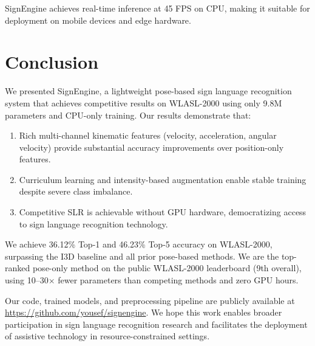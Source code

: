 \documentclass[conference]{IEEEtran}
\begin{document}
SignEngine achieves real-time inference at 45 FPS on CPU, making it suitable for deployment on mobile devices and edge hardware.

\section{Conclusion}

We presented SignEngine, a lightweight pose-based sign language recognition system that achieves competitive results on WLASL-2000 using only 9.8M parameters and CPU-only training. Our results demonstrate that:

\begin{enumerate}
    \item Rich multi-channel kinematic features (velocity, acceleration, angular velocity) provide substantial accuracy improvements over position-only features.
    \item Curriculum learning and intensity-based augmentation enable stable training despite severe class imbalance.
    \item Competitive SLR is achievable without GPU hardware, democratizing access to sign language recognition technology.
\end{enumerate}

We achieve 36.12\% Top-1 and 46.23\% Top-5 accuracy on WLASL-2000, surpassing the I3D baseline and all prior pose-based methods. We are the top-ranked pose-only method on the public WLASL-2000 leaderboard (9th overall), using 10--30$\times$ fewer parameters than competing methods and zero GPU hours.

Our code, trained models, and preprocessing pipeline are publicly available at \url{https://github.com/yousef/signengine}. We hope this work enables broader participation in sign language recognition research and facilitates the deployment of assistive technology in resource-constrained settings.



\end{document}
